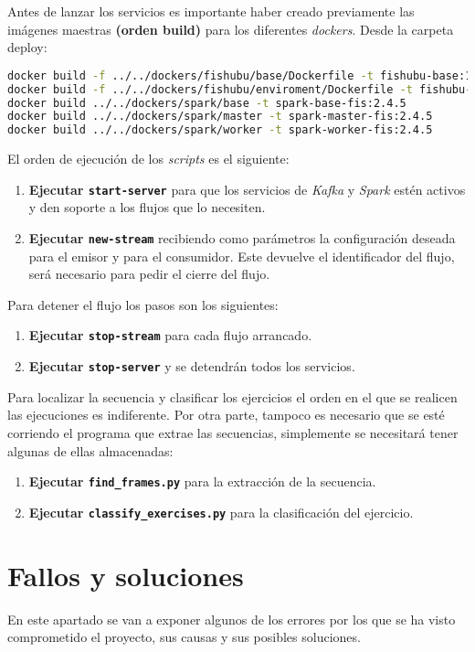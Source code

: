 Antes de lanzar los servicios es importante haber creado previamente las imágenes maestras \textbf{(orden build)} para los diferentes \textit{dockers}. Desde la carpeta deploy:
\begin{lstlisting}[language=Bash]
docker build -f ../../dockers/fishubu/base/Dockerfile -t fishubu-base:1.0.0 ../../
docker build -f ../../dockers/fishubu/enviroment/Dockerfile -t fishubu-env:1.0.0 ../../
docker build ../../dockers/spark/base -t spark-base-fis:2.4.5
docker build ../../dockers/spark/master -t spark-master-fis:2.4.5
docker build ../../dockers/spark/worker -t spark-worker-fis:2.4.5
\end{lstlisting}

El orden de ejecución de los \textit{scripts} es el siguiente:

\begin{enumerate}
	\item \textbf{Ejecutar \texttt{start-server}} para que los servicios de \textit{Kafka} y \textit{Spark} estén activos y den soporte a los flujos que lo necesiten.
	\item \textbf{Ejecutar \texttt{new-stream}} recibiendo como parámetros la configuración deseada para el emisor y para el consumidor.  Este devuelve el identificador del flujo, será necesario para pedir el cierre del flujo.
\end{enumerate}

Para detener el flujo los pasos son los siguientes:
\begin{enumerate}
	\item \textbf{Ejecutar \texttt{stop-stream}} para cada flujo arrancado.
	\item \textbf{Ejecutar \texttt{stop-server}} y se detendrán todos los servicios.
\end{enumerate}

Para localizar la secuencia y clasificar los ejercicios el orden en el que se realicen las ejecuciones es indiferente. Por otra parte, tampoco es necesario que se esté corriendo el programa que extrae las secuencias, simplemente se necesitará tener algunas de ellas almacenadas:
\begin{enumerate}
    \item \textbf{Ejecutar \texttt{find\_frames.py}} para la extracción de la secuencia.
    \item \textbf{Ejecutar \texttt{classify\_exercises.py}} para la clasificación del ejercicio.
\end{enumerate}

\section{Fallos y soluciones} \label{cap:FallosSoluciones}
En este apartado se van a exponer algunos de los errores por los que se ha visto comprometido el proyecto, sus causas y sus posibles soluciones. 

